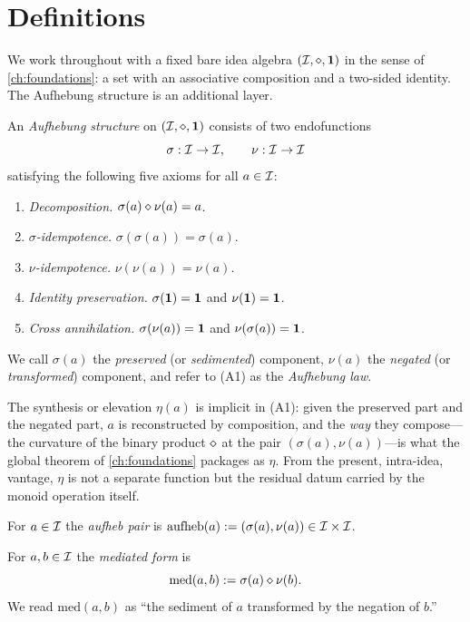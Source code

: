 \section{Definitions}\label{sec:aufheb-defs}

We work throughout with a fixed bare idea algebra
$(\mathcal{I},\mathbin{\diamond},\mathbf{1})$ in the sense of
\cref{ch:foundations}: a set with an associative composition and a
two-sided identity. The Aufhebung structure is an additional layer.

\begin{definition}\label{def:aufheb-struct}
An \emph{Aufhebung structure} on $(\mathcal{I},\mathbin{\diamond},\mathbf{1})$ consists
of two endofunctions
\[
\sigma:\mathcal{I}\to\mathcal{I},\qquad \nu:\mathcal{I}\to\mathcal{I}
\]
satisfying the following five axioms for all $a\in\mathcal{I}$:
\begin{enumerate}
\item[(A1)] \emph{Decomposition.} $\sigma(a)\mathbin{\diamond}\nu(a)=a$.
\item[(A2)] \emph{$\sigma$-idempotence.} $\sigma(\sigma(a))=\sigma(a)$.
\item[(A3)] \emph{$\nu$-idempotence.} $\nu(\nu(a))=\nu(a)$.
\item[(A4)] \emph{Identity preservation.} $\sigma(\mathbf{1})=\mathbf{1}$ and $\nu(\mathbf{1})=\mathbf{1}$.
\item[(A5)] \emph{Cross annihilation.}
$\sigma(\nu(a))=\mathbf{1}$ and $\nu(\sigma(a))=\mathbf{1}$.
\end{enumerate}
We call $\sigma(a)$ the \emph{preserved} (or \emph{sedimented})
component, $\nu(a)$ the \emph{negated} (or \emph{transformed})
component, and refer to (A1) as the \emph{Aufhebung law}.
\end{definition}

The synthesis or elevation $\eta(a)$ is implicit in (A1): given the
preserved part and the negated part, $a$ is reconstructed by
composition, and the \emph{way} they compose---the curvature of the
binary product $\mathbin{\diamond}$ at the pair $(\sigma(a),\nu(a))$---is what
the global theorem of \cref{ch:foundations} packages as $\eta$. From
the present, intra-idea, vantage, $\eta$ is not a separate function
but the residual datum carried by the monoid operation itself.

\begin{definition}\label{def:aufheb-pair}
For $a\in\mathcal{I}$ the \emph{aufheb pair} is
$\mathrm{aufheb}(a):=(\sigma(a),\nu(a))\in\mathcal{I}\times\mathcal{I}$.
\end{definition}

\begin{definition}[Mediation]\label{def:mediated}
For $a,b\in\mathcal{I}$ the \emph{mediated form} is
\[
\mathrm{med}(a,b):=\sigma(a)\mathbin{\diamond}\nu(b).
\]
We read $\mathrm{med}(a,b)$ as ``the sediment of $a$ transformed by the
negation of $b$.''
\end{definition}

